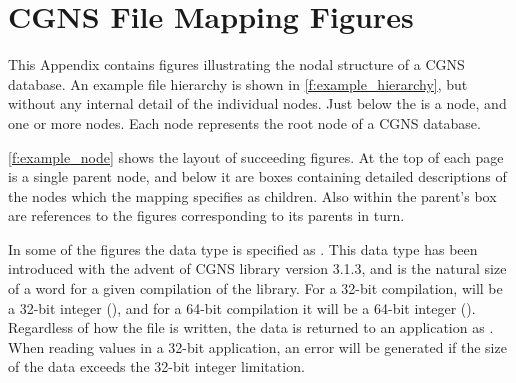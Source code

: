 \section{CGNS File Mapping Figures}
\label{s:figures}
\thispagestyle{plain}

This Appendix contains figures illustrating the nodal structure of
a CGNS database.
An example file hierarchy is shown in \autoref{f:example_hierarchy},
but without any internal detail of the individual nodes.
Just below the  is a  node, and
one or more  nodes.
Each  node represents the root node of a CGNS database.

\autoref{f:example_node} shows the layout of succeeding figures.
At the top of each page is a single parent node, and below it are boxes
containing detailed descriptions of the nodes which the mapping specifies
as children.
Also within the parent's box are references to the figures corresponding
to its parents in turn.

 In some of the figures the data type is specified as
. This data type has been introduced
with the advent of CGNS library version 3.1.3, and is the natural size
of a word for a given compilation of the library. For a 32-bit compilation,
 will be a 32-bit integer (),
and for a 64-bit compilation it will be a 64-bit integer ().
Regardless of how the file is written, the data is returned to an
application as . When reading 
values in a 32-bit application, an error will be generated if the size
of the data exceeds the 32-bit integer limitation.

\renewcommand{\topfraction}{1.00}
\renewcommand{\bottomfraction}{1.00}
\renewcommand{\textfraction}{0.0}
\setlength{\unitlength}{1em}	%

\newlength{\indName}
\newlength{\indLabel}
\newlength{\indDimensions}
\newlength{\indDimensionValues}
\newlength{\indData}
\newlength{\indParameters}
\newlength{\indFunctions}
\newlength{\indChildNodes}
\newlength{\indbullet}
\newlength{\spacea}
\newlength{\spaceb}
\newlength{\spacec}
\settowidth{\indbullet}{\textbullet ~~}
\setlength{\spacea}{\indDimensionValues-\indChildNodes}
\setlength{\spaceb}{\indDimensions-\indParameters+5em}
\setlength{\spacec}{\indDimensions-\indFunctions+5em}

